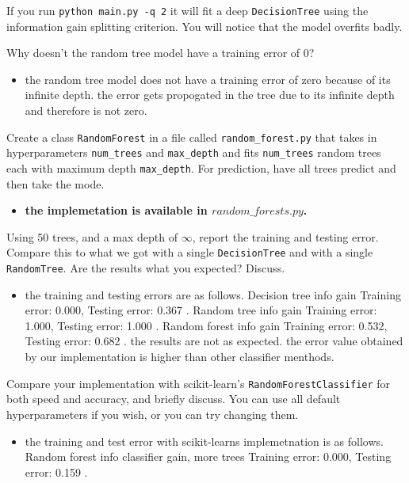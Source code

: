 \documentclass{article}
\def\blu#1{{\color{blu}#1}}
\def\items#1{\begin{itemize}#1\end{itemize}}
\def\enum#1{\begin{enumerate}#1\end{enumerate}}
\begin{document}
If you run \texttt{python main.py -q 2} it will fit a deep \texttt{DecisionTree}
using the information gain splitting criterion. You will notice that the model overfits badly.





\enum{
\blu {\item Why doesn't the random tree model have a training error of 0?}
\items {
\item the random tree model does not have a training error of zero because of its infinite depth. the error gets propogated in the tree due to its infinite depth and therefore is not zero.
}
\blu {\item Create a class \texttt{RandomForest} in a file called \texttt{random\string_forest.py} that takes in hyperparameters \texttt{num\string_trees} and \texttt{max\string_depth} and
fits \texttt{num\string_trees} random trees each with maximum depth \texttt{max\string_depth}. For prediction, have all trees predict and then take the mode.}
\items {
\item \bf { the implemetation is available in $random\_forests.py$.}
}
\blu {\item Using 50 trees, and a max depth of $\infty$, report the training and testing error. Compare this to what we got with a single \texttt{DecisionTree} and with a single \texttt{RandomTree}. Are the results what you expected? Discuss.}
\items {
\item the training and testing errors are as follows.
\newline  Decision tree info gain
    Training error: 0.000,
    Testing error: 0.367 .
 \newline Random tree info gain
    Training error: 1.000,
    Testing error: 1.000 .
 \newline Random forest info gain
Training error: 0.532,
    Testing error: 0.682 .
\newline the results are not as expected. the error value obtained by our implementation is higher than other classifier menthods.}
\blu {\item Compare your implementation with scikit-learn's \texttt{RandomForestClassifier} for both speed and accuracy, and briefly discuss. You can use all default hyperparameters if you wish, or you can try changing them.}
\items{
\item the training and test error with scikit-learns implemetnation is as follows.
\newline Random forest info classifier  gain, more trees
    Training error: 0.000,
    Testing error: 0.159 .}
}
\end{document}
